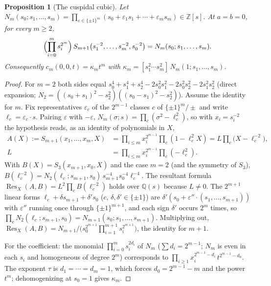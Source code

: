 \documentclass[11pt]{article}
\newcommand{\Q}{\mathbb Q}
\newcommand{\Z}{\mathbb Z}
\newcommand{\Res}{\operatorname{Res}}
\newtheorem{proposition}[theorem]{Proposition}
\theoremstyle{definition}
\theoremstyle{remark}
\begin{document}
\begin{proposition}[The cuspidal cubic]\label{prop:cusp}
Let $N_m(s_0;s_1,\ldots,s_m)=\prod_{\varepsilon\in\{\pm1\}^m}(s_0+\varepsilon_1s_1+\cdots+\varepsilon_ms_m)\in\Z[s]$.
At $a=b=0$, for every $m\ge2$,
\[
 \Bigl(\prod_{i=0}^m s_i^{2^m}\Bigr)\,S_{m+1}\bigl(s_1^{-2},\ldots,s_m^{-2},s_0^{-2}\bigr)=N_m(s_0;s_1,\ldots,s_m).
\]
Consequently $c_m(0,0,t)=\kappa_m t^m$ with
$\kappa_m=[s_1^2\cdots s_m^2]\,N_m(1;s_1,\ldots,s_m)$.
\end{proposition}
\begin{proof}
For $m=2$ both sides equal
$s_0^4+s_1^4+s_2^4-2s_0^2s_1^2-2s_0^2s_2^2-2s_1^2s_2^2$ (direct expansion;
$N_2=((s_0+s_1)^2-s_2^2)((s_0-s_1)^2-s_2^2)$).
Assume the identity for $m$. Fix representatives $\varepsilon_c$ of the
$2^{m-1}$ classes $c$ of $\{\pm1\}^m/\pm$ and write $\ell_c=\varepsilon_c\cdot s$.
Pairing $\varepsilon$ with $-\varepsilon$, $N_m(\sigma;s)=\prod_c(\sigma^2-\ell_c^2)$, so
with $x_i=s_i^{-2}$ the hypothesis reads, as an identity of polynomials in $X$,
\begin{align*}
 A(X):=S_{m+1}(x_1,\ldots,x_m,X)&=\prod_{i\le m}x_i^{2^{m-1}}\prod_c(1-\ell_c^2X)
 =L\prod_c\bigl(X-\ell_c^{-2}\bigr),\\
 L&=\prod_{i\le m}x_i^{2^{m-1}}\prod_c(-\ell_c^2).
\end{align*}
With $B(X)=S_3(x_{m+1},x_0,X)$ and the case $m=2$ (and the symmetry of $S_3$),
$B(\ell_c^{-2})=N_2(\ell_c;s_{m+1},s_0)\,s_{m+1}^{-4}s_0^{-4}\ell_c^{-4}$. The resultant
formula $\Res_X(A,B)=L^2\prod_cB(\ell_c^{-2})$ holds over $\Q(s)$ because
$L\ne0$. The $2^{m+1}$ linear forms $\ell_c+\delta s_{m+1}+\delta's_0$
($c$, $\delta,\delta'\in\{\pm1\}$) are $\delta'(s_0+\varepsilon''\cdot(s_1,\ldots,s_{m+1}))$
with $\varepsilon''$ running once through $\{\pm1\}^{m+1}$, and each sign
$\delta'$ occurs $2^m$ times, so $\prod_cN_2(\ell_c;s_{m+1},s_0)=N_{m+1}(s_0;s_1,\ldots,s_{m+1})$.
Multiplying out,
$\Res_X(A,B)=N_{m+1}\big/\bigl(s_0^{2^{m+1}}\prod_{i=1}^{m+1}s_i^{2^{m+1}}\bigr)$,
the identity for $m+1$.

For the coefficient: the monomial $\prod_{i=0}^ms_i^{2d_i}$ of $N_m$
($\sum d_i=2^{m-1}$; $N_m$ is even in each $s_i$ and homogeneous of degree $2^m$)
corresponds to $\prod_{i\ge1}x_i^{2^{m-1}-d_i}\,t^{2^{m-1}-d_0}$. The exponent
$\tau$ is $d_1=\cdots=d_m=1$, which forces $d_0=2^{m-1}-m$ and the power
$t^m$; dehomogenizing at $s_0=1$ gives $\kappa_m$.
\end{proof}
\end{document}
